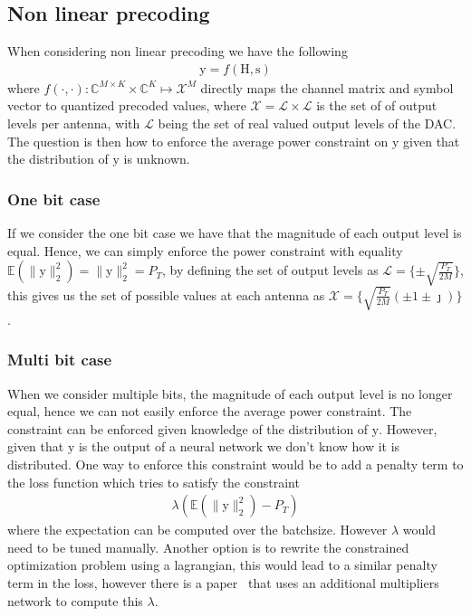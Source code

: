 \documentclass[12pt]{article}
\newcommand{\vect}[1]{\boldsymbol{\mathrm{#1}}}
\newcommand{\mat}[1]{\boldsymbol{\mathrm{#1}}}
\newcommand{\expt}[1]{\mathbb{E}\left(#1\right)}
\theoremstyle{remark}
\begin{document}
\subsection{Non linear precoding}
When considering non linear precoding we have the following
\begin{align}
	\vect{y} = f\left(\mat{H}, \vect{s}\right)
\end{align}
where $f(\cdot, \cdot): \mathbb{C}^{M\times K} \times \mathbb{C}^{K} \mapsto \mathcal{X}^{M}$ directly maps the channel matrix and symbol vector to quantized precoded values, where $\mathcal{X} = \mathcal{L} \times \mathcal{L}$ is the set of of output levels per antenna, with $\mathcal{L}$ being the set of real valued output levels of the DAC. The question is then how to enforce the average power constraint on $\vect{y}$ given that the distribution of $\vect{y}$ is unknown.


\subsubsection{One bit case}
If we consider the one bit case we have that the magnitude of each output level is equal. Hence, we can simply enforce the power constraint with equality $\expt{\|\vect{y}\|_2^2} = \|\vect{y}\|_2^2 = P_T$, by defining the set of output levels as $\mathcal{L} = \{\pm \sqrt{\frac{P_T}{2M}}\}$, this gives us the set of possible values at each antenna as $\mathcal{X} = \{\sqrt{\frac{P_T}{2M}} (\pm 1 \pm \jmath)\}$. 

\subsubsection{Multi bit case}
When we consider multiple bits, the magnitude of each output level is no longer equal, hence we can not easily enforce the average power constraint. The constraint can be enforced given knowledge of the distribution of $\vect{y}$. However, given that $\vect{y}$ is the output of a neural network we don't know how it is distributed. 
One way to enforce this constraint would be to add a penalty term to the loss function which tries to satisfy the constraint
\begin{align}
	\lambda \left(\expt{\|\vect{y}\|_2^2} - P_T\right)
\end{align}
where the expectation can be computed over the batchsize. However $\lambda$ would need to be tuned manually. 
Another option is to rewrite the constrained optimization problem using a lagrangian, this would lead to a similar penalty term in the loss, however there is a paper~\cite{constraint_nn} that uses an additional multipliers network to compute this $\lambda$. 
\end{document}
